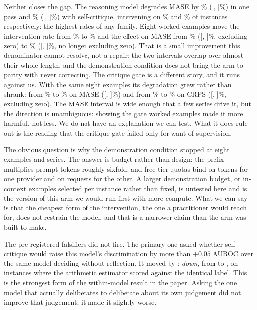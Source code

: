 Neither closes the gap. The reasoning model degrades MASE by \reasonMaseSinglePct\%
([\reasonMaseSingleCIlo, \reasonMaseSingleCIhi]\%) in one pass and
\reasonMaseCritiquePct\% ([\reasonMaseCritiqueCIlo, \reasonMaseCritiqueCIhi]\%) with
self-critique, intervening on \reasonRateSingle\% and \reasonRateCritique\% of instances
respectively: the highest rates of any family. Eight worked examples move the
intervention rate from \zeroshotRateSingle\% to \fewshotRateSingle\% and the effect on
MASE from \zeroshotMaseSinglePct\% ([\zeroshotMaseSingleCIlo,
\zeroshotMaseSingleCIhi]\%, excluding zero) to \fewshotMaseSinglePct\%
([\fewshotMaseSingleCIlo, \fewshotMaseSingleCIhi]\%, no longer excluding zero). That is a small improvement this denominator cannot resolve, not a repair: the
two intervals overlap over almost their whole length, and the demonstration condition does
not bring the arm to parity with never correcting. The critique gate is a different story, and it runs against us. With the same eight
examples its degradation grew rather than shrank: from \zeroshotMaseCritiquePct\% to
\fewshotMaseCritiquePct\% on MASE ([\fewshotMaseCritiqueCIlo, \fewshotMaseCritiqueCIhi]\%)
and from \zeroshotCrpsCritiquePct\% to \fewshotCrpsCritiquePct\% on CRPS
([\fewshotCrpsCritiqueCIlo, \fewshotCrpsCritiqueCIhi]\%, excluding zero). The MASE
interval is wide enough that a few series drive it, but the direction is unambiguous:
showing the gate worked examples made it more harmful, not less. We do not have an
explanation we can test. What it does rule out is the reading that the critique gate
failed only for want of supervision.

The obvious question is why the demonstration condition stopped at eight examples and
\fewshotSeries{} series. The answer is budget rather than design: the prefix multiplies
prompt tokens roughly sixfold, and free-tier quotas bind on tokens for one provider and
on requests for the other. A larger demonstration budget, or in-context examples
selected per instance rather than fixed, is untested here and is the version of this
arm we would run first with more compute. What we can say is that the cheapest form of
the intervention, the one a practitioner would reach for, does not restrain the
model, and that is a narrower claim than the arm was built to make.

The pre-registered falsifiers did not fire. The primary one asked whether self-critique
would raise this model's discrimination by more than $+0.05$ AUROC over the same model
deciding without reflection. It moved by \reasonAurocDelta{}: \emph{down}, from
\reasonAurocSingle{} to \reasonAurocCritique{}, on \reasonDiscrimN{} instances where the
arithmetic estimator scored \reasonAurocArithmetic{} against the identical label. This is
the strongest form of the within-model result in the paper. Asking the one model that
actually deliberates to deliberate about its own judgement did not improve that judgement;
it made it slightly worse.

